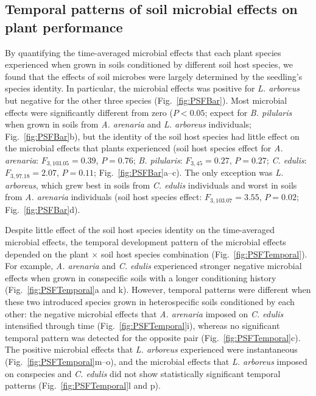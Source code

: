 \subsection*{Temporal patterns of soil microbial effects on plant performance}
By quantifying the time-averaged microbial effects that each plant species experienced when grown in soils conditioned by different soil host species, we found that the effects of soil microbes were largely determined by the seedling's species identity.
In particular, the microbial effects was positive for \textit{L. arboreus} but negative for the other three species (Fig.~\ref{fig:PSFBar}). 
Most microbial effects were significantly different from zero ($P<0.05$; expect for \textit{B. pilularis} when grown in soils from \textit{A. arenaria} and \textit{L. arboreus} individuals; Fig.~\ref{fig:PSFBar}b), but the identity of the soil host species had little effect on the microbial effects that plants experienced (soil host species effect for \textit{A. arenaria}: $F_{3, 103.05}=0.39$, $P=0.76$; \textit{B. pilularis}: $F_{3, 45}=0.27$, $P=0.27$; \textit{C. edulis}: $F_{3, 97.18}=2.07$, $P=0.11$; Fig.~\ref{fig:PSFBar}a--c). The only exception was \textit{L. arboreus}, which grew best in soils from \textit{C. edulis} individuals and worst in soils from \textit{A. arenaria} individuals (soil host species effect: $F_{3, 103.07}=3.55$, $P=0.02$; Fig.~\ref{fig:PSFBar}d).
\par


Despite little effect of the soil host species identity on the time-averaged microbial effects, the temporal development pattern of the microbial effects depended on the plant $\times$ soil host species combination (Fig.~\ref{fig:PSFTemporal}). 
For example, \textit{A. arenaria} and \textit{C. edulis} experienced stronger negative microbial effects when grown in conspecific soils with a longer conditioning history (Fig.~\ref{fig:PSFTemporal}a and k). However, temporal patterns were different when these two introduced species grown in heterospecific soils conditioned by each other: the negative microbial effects that \textit{A. arenaria} imposed on \textit{C. edulis} intensified through time (Fig.~\ref{fig:PSFTemporal}i), whereas no significant temporal pattern was detected for the opposite pair (Fig.~\ref{fig:PSFTemporal}c).
The positive microbial effects that \textit{L. arboreus} experienced were instantaneous (Fig.~\ref{fig:PSFTemporal}m--o), and the microbial effects that \textit{L. arboreus} imposed on conspecies and \textit{C. edulis} did not show statistically significant temporal patterns (Fig.~\ref{fig:PSFTemporal}l and p).
\par



